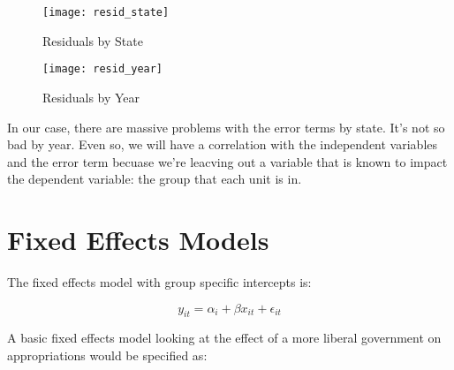 \documentclass[12pt]{article}
\begin{document}
\begin{figure}[h]
  \centering
  \texttt{[image: resid\_state]}
  \caption{Residuals by State}
\end{figure}


\begin{figure}[h]
  \centering
  \texttt{[image: resid\_year]}
  \caption{Residuals by Year}
\end{figure}

In our case, there are massive problems with the error terms by
state. It's not so bad by year. Even so, we will have a correlation
with the independent variables and the error term becuase we're
leacving out a variable that is known to impact the dependent
variable: the group that each unit is in. 

\section{Fixed Effects Models}


The fixed effects model with group specific intercepts is: 

\begin{equation*}
  \label{eq:ols}
  y_{it}=\alpha_i+ \beta x_{it} + \epsilon_{it}
\end{equation*}


A basic fixed effects model looking at the effect of a more liberal
government on appropriations would be specified as:
\end{document}
